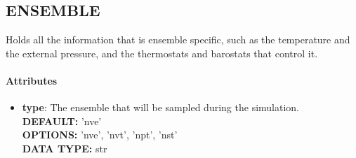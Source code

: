 \subsection{ENSEMBLE}
\label{ENSEMBLE}
Holds all the information that is ensemble specific, such as the temperature and the external pressure, and the thermostats and barostats that control it.
\paragraph{Attributes}
 \begin{itemize}
\item {\bf type}:
 The ensemble that will be sampled during the simulation.
{\\ \bf DEFAULT: }'nve'
{\\ \bf OPTIONS: }'nve', 'nvt', 'npt', 'nst'
{\\ \bf DATA TYPE: }str
\end{itemize}
 
